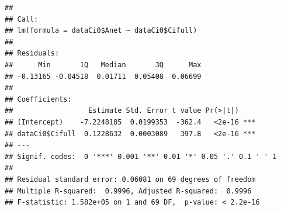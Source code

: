 \documentclass[
]{krantz}
\makeatletter
\newenvironment{Shaded}{\begin{snugshade}}{\end{snugshade}}
\newcommand{\CommentTok}[1]{\textcolor[rgb]{0.56,0.35,0.01}{\textit{#1}}}
\newcommand{\DecValTok}[1]{\textcolor[rgb]{0.00,0.00,0.81}{#1}}
\newcommand{\FunctionTok}[1]{\textcolor[rgb]{0.00,0.00,0.00}{#1}}
\newcommand{\NormalTok}[1]{#1}
\newcommand{\OtherTok}[1]{\textcolor[rgb]{0.56,0.35,0.01}{#1}}
\newcommand{\SpecialCharTok}[1]{\textcolor[rgb]{0.00,0.00,0.00}{#1}}
\newcommand{\StringTok}[1]{\textcolor[rgb]{0.31,0.60,0.02}{#1}}
\newenvironment{kframe}{%
\medskip{}
\setlength{\fboxsep}{.8em}
 \def\at@end@of@kframe{}%
 \ifinner\ifhmode%
  \def\at@end@of@kframe{\end{minipage}}%
  \begin{minipage}{\columnwidth}%
 \fi\fi%
 \def\FrameCommand##1{\hskip\@totalleftmargin \hskip-\fboxsep
 \colorbox{shadecolor}{##1}\hskip-\fboxsep
     \hskip-\linewidth \hskip-\@totalleftmargin \hskip\columnwidth}%
 \MakeFramed {\advance\hsize-\width
   \@totalleftmargin\z@ \linewidth\hsize
   \@setminipage}}%
 {\par\unskip\endMakeFramed%
 \at@end@of@kframe}
\renewenvironment{Shaded}{\begin{kframe}}{\end{kframe}}
\makeatother
\begin{document}
\begin{Shaded}
\end{Shaded}

\begin{verbatim}
## 
## Call:
## lm(formula = dataCi0$Anet ~ dataCi0$Cifull)
## 
## Residuals:
##      Min       1Q   Median       3Q      Max 
## -0.13165 -0.04518  0.01711  0.05408  0.06699 
## 
## Coefficients:
##                  Estimate Std. Error t value Pr(>|t|)    
## (Intercept)    -7.2248105  0.0199353  -362.4   <2e-16 ***
## dataCi0$Cifull  0.1228632  0.0003089   397.8   <2e-16 ***
## ---
## Signif. codes:  0 '***' 0.001 '**' 0.01 '*' 0.05 '.' 0.1 ' ' 1
## 
## Residual standard error: 0.06081 on 69 degrees of freedom
## Multiple R-squared:  0.9996, Adjusted R-squared:  0.9996 
## F-statistic: 1.582e+05 on 1 and 69 DF,  p-value: < 2.2e-16
\end{verbatim}
\end{document}

